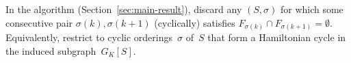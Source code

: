 \begin{corollary}\label{cor:adjacency-pruning}
In the algorithm (Section~\ref{sec:main-result}), discard any
$(S, \sigma)$ for which some consecutive pair
$\sigma(k), \sigma(k{+}1)$ (cyclically) satisfies
$F_{\sigma(k)} \cap F_{\sigma(k+1)} = \emptyset$.
Equivalently, restrict to cyclic orderings~$\sigma$ of~$S$ that
form a Hamiltonian cycle in the induced subgraph~$G_K[S]$.
\end{corollary}

